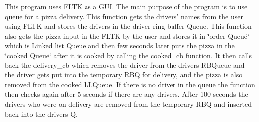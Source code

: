 This program uses F\+L\+T\+K as a G\+U\+I. The main purpose of the program is to use queue for a pizza delivery. This function gets the drivers' names from the user using F\+L\+T\+K and stores the drivers in the driver ring buffer Queue. This function also gets the pizza input in the F\+L\+T\+K by the user and stores it in \char`\"{}order Queue\char`\"{} which is Linked list Queue and then few seconds later puts the pizza in the \char`\"{}cooked Queue\char`\"{} after it is cooked by calling the cooked\+\_\+cb function. It then calls back the delivery\+\_\+cb which removes the driver from the drivers R\+B\+Queue and the driver gets put into the temporary R\+B\+Q for delivery, and the pizza is also removed from the cooked L\+L\+Queue. If there is no driver in the queue the function then checks again after 5 seconds if there are any drivers. After 100 seconds the drivers who were on delivery are removed from the temporary R\+B\+Q and inserted back into the drivers Q. 
